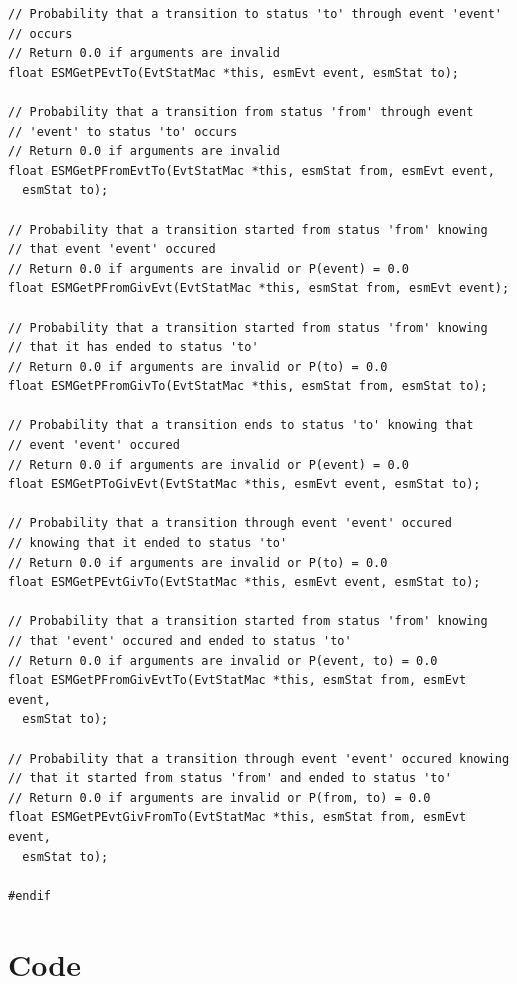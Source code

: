 \documentclass[12pt, a4paper]{article}
\begin{document}
\begin{scriptsize}
\begin{ttfamily}
\begin{lstlisting}
// Probability that a transition to status 'to' through event 'event' 
// occurs
// Return 0.0 if arguments are invalid
float ESMGetPEvtTo(EvtStatMac *this, esmEvt event, esmStat to);

// Probability that a transition from status 'from' through event 
// 'event' to status 'to' occurs
// Return 0.0 if arguments are invalid
float ESMGetPFromEvtTo(EvtStatMac *this, esmStat from, esmEvt event,
  esmStat to);

// Probability that a transition started from status 'from' knowing 
// that event 'event' occured
// Return 0.0 if arguments are invalid or P(event) = 0.0
float ESMGetPFromGivEvt(EvtStatMac *this, esmStat from, esmEvt event);

// Probability that a transition started from status 'from' knowing 
// that it has ended to status 'to'
// Return 0.0 if arguments are invalid or P(to) = 0.0
float ESMGetPFromGivTo(EvtStatMac *this, esmStat from, esmStat to);

// Probability that a transition ends to status 'to' knowing that 
// event 'event' occured
// Return 0.0 if arguments are invalid or P(event) = 0.0
float ESMGetPToGivEvt(EvtStatMac *this, esmEvt event, esmStat to);

// Probability that a transition through event 'event' occured
// knowing that it ended to status 'to'
// Return 0.0 if arguments are invalid or P(to) = 0.0
float ESMGetPEvtGivTo(EvtStatMac *this, esmEvt event, esmStat to);

// Probability that a transition started from status 'from' knowing 
// that 'event' occured and ended to status 'to'
// Return 0.0 if arguments are invalid or P(event, to) = 0.0
float ESMGetPFromGivEvtTo(EvtStatMac *this, esmStat from, esmEvt event,
  esmStat to);

// Probability that a transition through event 'event' occured knowing 
// that it started from status 'from' and ended to status 'to'
// Return 0.0 if arguments are invalid or P(from, to) = 0.0
float ESMGetPEvtGivFromTo(EvtStatMac *this, esmStat from, esmEvt event, 
  esmStat to);

#endif
\end{lstlisting}
\end{ttfamily}
\end{scriptsize}

\section{Code}
\end{document}
